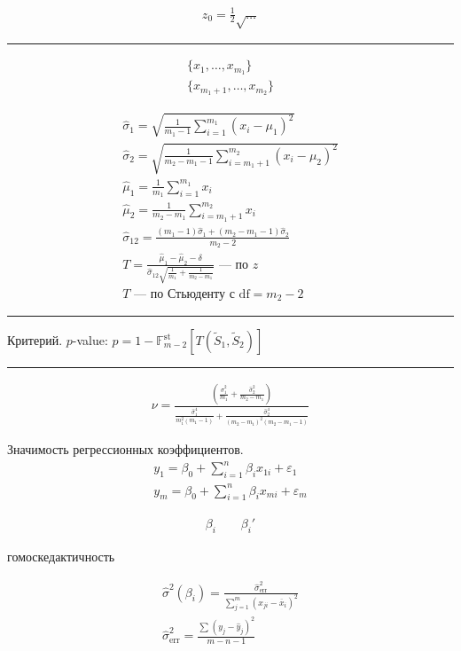 \documentclass{book}
\begin{document}
\begin{gather*}
  z_0=\frac{1}{2}\sqrt{\dots}
\end{gather*}


\hrule

\begin{gather*}
  \{x_1, \dots, x_{m_1}\}\\
  \{x_{m_1+1}, \dots, x_{m_2}\}
\end{gather*}

\begin{gather*}
  \hat{\sigma}_1=\sqrt{\frac{1}{m_1-1}\sum_{i=1}^{m_1} {(x_i-\mu_1)^2}}\\
  \hat{\sigma}_2=\sqrt{\frac{1}{m_2-m_1-1}\sum_{i=m_1+1}^{m_2} {(x_i-\mu_2)^2}}\\
  \hat{\mu}_1=\frac{1}{m_1}\sum_{i=1}^{m_1} {x_i}\\
  \hat{\mu}_2=\frac{1}{m_2-m_1}\sum_{i=m_1+1}^{m_2} {x_i}\\
  \hat{\sigma}_{12}=\frac{(m_1-1)\hat{\sigma}_1+(m_2-m_1-1)\hat{\sigma}_2}{m_2-2}\\
  T=\frac{\hat{\mu}_1-\hat{\mu}_2-\delta}{\hat{\sigma}_{12}\sqrt{\frac{1}{m_1}+\frac{1}{m_2-m_1}}}\textrm{ --- по $z$}\\
  T \textrm{ --- по Стьюденту с $\mathrm{df}=m_2-2$}
\end{gather*}

\hrule

Критерий. $p$-value: $p=1-\mathbb{F}^\textrm{st}_{m-2}[T(\tilde{S}_1, \tilde{S}_2)]$

\hrule

\begin{gather*}
  \nu=\frac{\left(\frac{\hat{\sigma}_1^2}{m_1}+\frac{\hat{\sigma}_2^2}{m_2-m_1}\right)}{\frac{\hat{\sigma}_1^4}{m_1^2(m_1-1)}+\frac{\hat{\sigma}_2^4}{(m_2-m_1)^2(m_2-m_1-1)}}
\end{gather*}

Значимость регрессионных коэффициентов.
\begin{gather*}
  y_1=\beta_0+\sum_{i=1}^{n} {\beta_ix_{1i}}+\varepsilon_1\\
  y_m=\beta_0+\sum_{i=1}^{n} {\beta_ix_{mi}}+\varepsilon_m
\end{gather*}

\begin{gather*}
  \beta_i~~~~~~~~~\beta_i'
\end{gather*}

гомоскедактичность

\begin{gather*}
    \hat{\sigma}^2(\beta_i)=\frac{\hat{\sigma}^2_\textrm{err}}{\sum_{j=1}^{m} {(x_{ji}-\overline{x}_i)^2}}\\
    \hat{\sigma}^2_\textrm{err}=\frac{\sum_{}^{} {(y_j-\hat{y}_j)^2}}{m-n-1}
\end{gather*}
\end{document}
